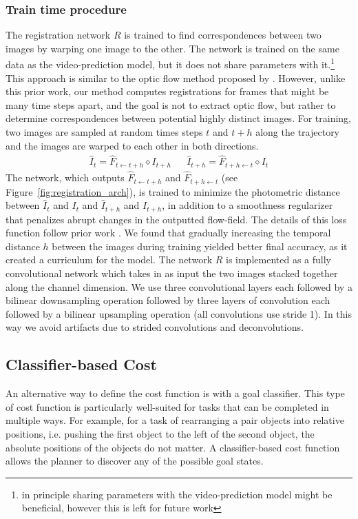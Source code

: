 \subsubsection{Train time procedure}
The registration network $R$ is trained to find correspondences between two images by warping one image to the other. The network is trained on the same data as the video-prediction model, but it does not share parameters with it.\footnote{in principle sharing parameters with the video-prediction model might be beneficial, however this is left for future work} This approach is similar to the optic flow method proposed by \citet{meister2017unflow}. However, unlike this prior work, our method computes registrations for frames that might be many time steps apart, and the goal is not to extract optic flow, but rather to determine correspondences between potential highly distinct images. For training, two images are sampled at random times steps $t$ and $t+h$ along the trajectory and the images are warped to each other in both directions. 
\begin{align}
     \hat{I}_{t} = \hat{F}_{t \leftarrow t +h} \diamond  I_{t+h} &&
     \hat{I}_{t+h} = \hat{F}_{t+h \leftarrow t} \diamond  I_{t}
\end{align}
The network, which outputs $\hat{F}_{t \leftarrow t +h}$ and $\hat{F}_{t+h \leftarrow t}$ (see Figure~\ref{fig:registration_arch}), is trained to minimize the photometric distance between $\hat{I}_t$ and $I_t$ and $\hat{I}_{t+h}$ and $I_{t+h}$, in addition to a smoothness regularizer that penalizes abrupt changes in the outputted flow-field. The details of this loss function follow prior work \cite{meister2017unflow}. We found that gradually increasing the temporal distance $h$ between the images during training yielded better final accuracy, as it created a curriculum for the model. The network $R$ is implemented as a fully convolutional network which takes in as input the two images stacked together along the channel dimension. We use three convolutional layers each followed by a bilinear downsampling operation followed by three layers of convolution each followed by a bilinear upsampling operation (all convolutions use stride 1). In this way we avoid artifacts due to strided convolutions and deconvolutions.


\subsection{Classifier-based Cost}
\label{subsec:class_cost}
An alternative way to define the cost function is with a goal classifier. This type of cost function is particularly well-suited for tasks that can be completed in multiple ways. For example, for a task of rearranging a pair objects into relative positions, i.e. pushing the first object to the left of the second object, the absolute positions of the objects do not matter. A classifier-based cost function allows the planner to discover any of the possible goal states.

